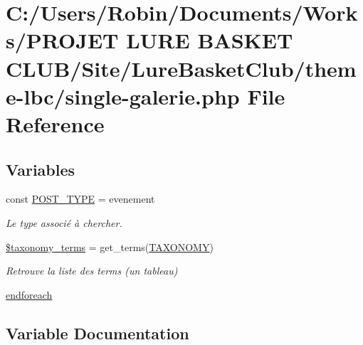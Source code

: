 \hypertarget{single-galerie_8php}{}\section{C\+:/\+Users/\+Robin/\+Documents/\+Works/\+P\+R\+O\+J\+ET L\+U\+RE B\+A\+S\+K\+ET C\+L\+U\+B/\+Site/\+Lure\+Basket\+Club/theme-\/lbc/single-\/galerie.php File Reference}
\label{single-galerie_8php}
\subsection*{Variables}
\begin{DoxyCompactItemize}
\item 
const \hyperlink{single-galerie_8php_aef7d3346406e86714e365321541f4d97}{P\+O\+S\+T\+\_\+\+T\+Y\+PE} = \textquotesingle{}evenement\textquotesingle{}
\begin{DoxyCompactList}\small\item\em Le type associé à chercher. \end{DoxyCompactList}\item 
\hyperlink{single-galerie_8php_a1bb9ed78e368f91696e146ce36663486}{\$taxonomy\+\_\+terms} = get\+\_\+terms(\hyperlink{archive-matchs_8php_a1dc6041def2926dbb45188d4f766d4b3}{T\+A\+X\+O\+N\+O\+MY})
\begin{DoxyCompactList}\small\item\em Retrouve la liste des terms (un tableau) \end{DoxyCompactList}\item 
\hyperlink{single-galerie_8php_a672d9707ef91db026c210f98cc601123}{endforeach}
\end{DoxyCompactItemize}


\subsection{Variable Documentation}
\hypertarget{single-galerie_8php_a1bb9ed78e368f91696e146ce36663486}{}\label{single-galerie_8php_a1bb9ed78e368f91696e146ce36663486} 
